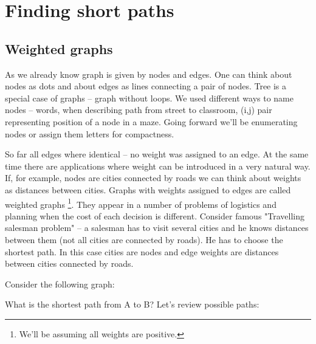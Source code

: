 \chapter{Finding short paths}


\section{Weighted graphs}

As we already know graph is given by nodes and edges. One can think
about nodes as dots and about edges as lines connecting
a pair of nodes. Tree is a special case of graphs -- graph without loops.
We used different ways to name nodes -- words, when describing
path from street to classroom, (i,j) pair representing
position of a node in a maze. Going forward we'll be
enumerating nodes or assign them letters for compactness.

So far all edges where identical -- no weight was assigned
to an edge. At the same time there are applications where
weight can be introduced in a very natural way. If, for example,
nodes are cities connected by roads we can think about weights
as distances between cities. Graphs with weights assigned to
edges are called weighted graphs \footnote{We'll be assuming
all weights are positive.}. They appear in a number of
problems of logistics and planning when the cost of
each decision is different. Consider famous
"Travelling salesman problem" -- a salesman has to visit
several cities and he knows distances between them (not all
cities are connected by roads). He has to choose the shortest path.
In this case cities are nodes and edge weights are distances
between cities connected by roads.

Consider the following graph:




What is the shortest path from A to B?
Let's review possible paths:

